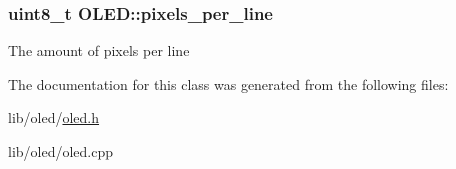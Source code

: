 \subsubsection[{\texorpdfstring{pixels\+\_\+per\+\_\+line}{pixels_per_line}}]{\setlength{\rightskip}{0pt plus 5cm}uint8\+\_\+t O\+L\+E\+D\+::pixels\+\_\+per\+\_\+line\hspace{0.3cm}{\ttfamily [protected]}}\hypertarget{class_o_l_e_d_a6ddac7b826eccac8c682c5246ef52b29}{}\label{class_o_l_e_d_a6ddac7b826eccac8c682c5246ef52b29}
The amount of pixels per line 

The documentation for this class was generated from the following files\+:\begin{DoxyCompactItemize}
\item 
lib/oled/\hyperlink{oled_8h}{oled.\+h}\item 
lib/oled/oled.\+cpp\end{DoxyCompactItemize}
